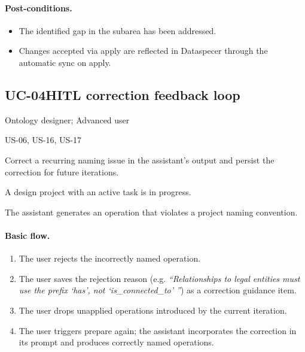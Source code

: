 \documentclass{article}
\begin{document}
\paragraph*{Post-conditions.}
\begin{itemize}
  \item The identified gap in the subarea has been addressed.
  \item Changes accepted via apply are reflected in Dataspecer through the automatic sync on apply.
\end{itemize}

\subsection{UC-04\quad HITL correction feedback loop}
\label{sec:uc-04}

\begin{description}[leftmargin=3.8cm,style=nextline]
  \item[Actors] Ontology designer; Advanced user
  \item[Based on user stories] US-06, US-16, US-17
  \item[Goal] Correct a recurring naming issue in the assistant's output and persist the correction for future iterations.
  \item[Pre-conditions]
    A design project with an active task is in progress.
  \item[Trigger] The assistant generates an operation that violates a project naming convention.
\end{description}

\paragraph*{Basic flow.}
\begin{enumerate}
  \item The user rejects the incorrectly named operation.
  \item The user saves the rejection reason (e.g. \textit{``Relationships to legal entities must use the prefix `has', not `is\_connected\_to' ''}) as a correction guidance item.
  \item The user drops unapplied operations introduced by the current iteration.
  \item The user triggers prepare again; the assistant incorporates the correction in its prompt and produces correctly named operations.
\end{enumerate}
\end{document}
